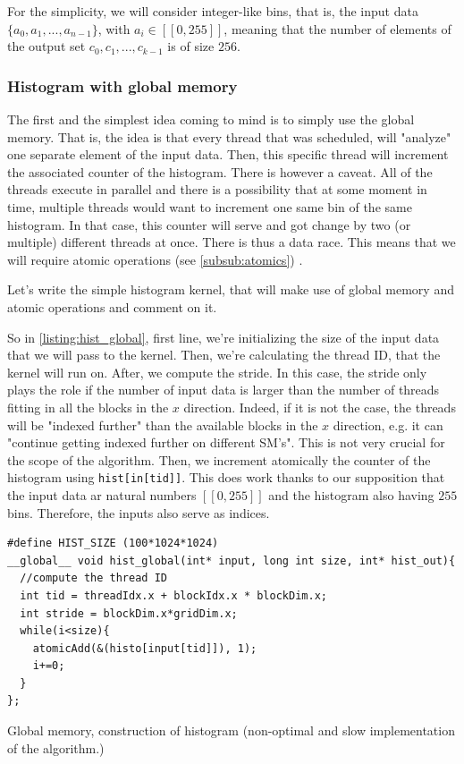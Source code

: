For the simplicity, we will consider integer-like bins, that is, the input data $\{a_0, a_1, ..., a_{n-1}\}$, with 
$a_i \in [\![0,255]\!]$, meaning that the number of elements of the output set $c_0, c_1, ..., c_{k-1}$ is of size $256$.

\subsubsection*{Histogram with global memory}
The first and the simplest idea coming to mind is to simply use the global memory. 
That is, the idea is that every thread that was scheduled, will "analyze" one separate element of the 
input data. Then, this specific thread will increment the associated counter of the histogram.
There is however a caveat. All of the threads execute in parallel and there is a possibility 
that at some moment in time, multiple threads would want to increment one same bin of the same 
histogram. In that case, this counter will serve and got change by two (or multiple) different
threads at once. There is thus a data race. This means that we will require atomic operations
(see \autoref{subsub:atomics}) \cite{osnovi_raboti}. 

Let's write the simple histogram kernel, that will make use of global memory and atomic 
operations and comment on it.

So in \autoref{listing:hist_global}, first line, we're initializing the size of the 
input data that we will pass to the kernel. Then, we're calculating the thread ID, that 
the kernel will run on. After, we compute the stride. In this case, the stride only plays the 
role if the number of input data is larger than the number of threads fitting in all the blocks 
in the $x$ direction. Indeed, if it is not the case, the threads will be "indexed further" than the 
available blocks in the $x$ direction, e.g. it can "continue getting indexed further on different SM's". 
This is not very crucial for the scope of the algorithm.
Then, we increment atomically the counter of the histogram using \verb|hist[in[tid]]|. This does work thanks 
to our supposition that the input data ar natural numbers $[\![0,255]\!]$ and the histogram also having 
$255$ bins. Therefore, the inputs also serve as indices.

\begin{listing}[ht!]
\begin{verbatim}
#define HIST_SIZE (100*1024*1024)
__global__ void hist_global(int* input, long int size, int* hist_out){
  //compute the thread ID 
  int tid = threadIdx.x + blockIdx.x * blockDim.x;
  int stride = blockDim.x*gridDim.x;
  while(i<size){
    atomicAdd(&(histo[input[tid]]), 1);
    i+=0;
  }
};
\end{verbatim}
\caption{Global memory, construction of histogram (non-optimal and 
slow implementation of the algorithm.)}
\label{listing:hist_global}
\end{listing}


